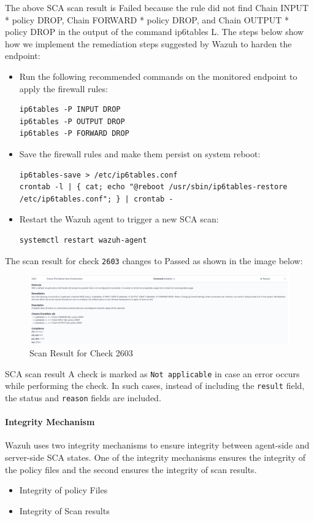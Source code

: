 The above SCA scan result is Failed because the rule did not find Chain INPUT * policy DROP, Chain FORWARD * policy DROP, and Chain OUTPUT * policy DROP in the output of the command ip6tables \-L. The steps below show how we implement the remediation steps suggested by Wazuh to harden the endpoint:

\begin{itemize}
    \item Run the following recommended commands on the monitored endpoint to apply the firewall rules:
          \begin{verbatim}
ip6tables -P INPUT DROP
ip6tables -P OUTPUT DROP
ip6tables -P FORWARD DROP
    \end{verbatim}
    \item Save the firewall rules and make them persist on system reboot:
          \begin{verbatim}
ip6tables-save > /etc/ip6tables.conf
crontab -l | { cat; echo "@reboot /usr/sbin/ip6tables-restore /etc/ip6tables.conf"; } | crontab -
    \end{verbatim}
    \item Restart the Wazuh agent to trigger a new SCA scan:
          \begin{verbatim}
systemctl restart wazuh-agent
    \end{verbatim}
\end{itemize}
The scan result for check \texttt{2603} changes to Passed as shown in the image below:

\begin{figure} [H]
    \centering
    \includegraphics[width=\textwidth]{images/sca/sca-14.png}
    \caption{Scan Result for Check 2603}
    \label{fig:sca-14}
\end{figure}


SCA scan result
A check is marked as \texttt{Not applicable} in case an error occurs while performing the check. In such cases, instead of including the \texttt{result} field, the status and \texttt{reason} fields are included.

\paragraph{Integrity Mechanism}
Wazuh uses two integrity mechanisms to ensure integrity between agent-side and server-side SCA states. One of the integrity mechanisms ensures the integrity of the policy files and the second ensures the integrity of scan results.
\begin{itemize}
    \item Integrity of policy Files
    \item Integrity of Scan results
\end{itemize}

